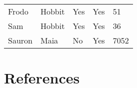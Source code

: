 \documentclass[
]{article}
\begin{document}
\begin{longtable}[]{@{}lllll@{}}
\begin{minipage}[t]{0.11\columnwidth}
Frodo\strut
\end{minipage} & \begin{minipage}[t]{0.11\columnwidth}\raggedright
Hobbit\strut
\end{minipage} & \begin{minipage}[t]{0.25\columnwidth}\raggedright
Yes\strut
\end{minipage} & \begin{minipage}[t]{0.24\columnwidth}\raggedright
Yes\strut
\end{minipage} & \begin{minipage}[t]{0.07\columnwidth}\raggedright
51\strut
\end{minipage}\tabularnewline
\begin{minipage}[t]{0.11\columnwidth}\raggedright
Sam\strut
\end{minipage} & \begin{minipage}[t]{0.11\columnwidth}\raggedright
Hobbit\strut
\end{minipage} & \begin{minipage}[t]{0.25\columnwidth}\raggedright
Yes\strut
\end{minipage} & \begin{minipage}[t]{0.24\columnwidth}\raggedright
Yes\strut
\end{minipage} & \begin{minipage}[t]{0.07\columnwidth}\raggedright
36\strut
\end{minipage}\tabularnewline
\begin{minipage}[t]{0.11\columnwidth}\raggedright
Sauron\strut
\end{minipage} & \begin{minipage}[t]{0.11\columnwidth}\raggedright
Maia\strut
\end{minipage} & \begin{minipage}[t]{0.25\columnwidth}\raggedright
No\strut
\end{minipage} & \begin{minipage}[t]{0.24\columnwidth}\raggedright
Yes\strut
\end{minipage} & \begin{minipage}[t]{0.07\columnwidth}\raggedright
7052\strut
\end{minipage}\tabularnewline
\bottomrule
\end{longtable}

\hypertarget{references}{%
\section{References}\label{references}}
\end{document}
